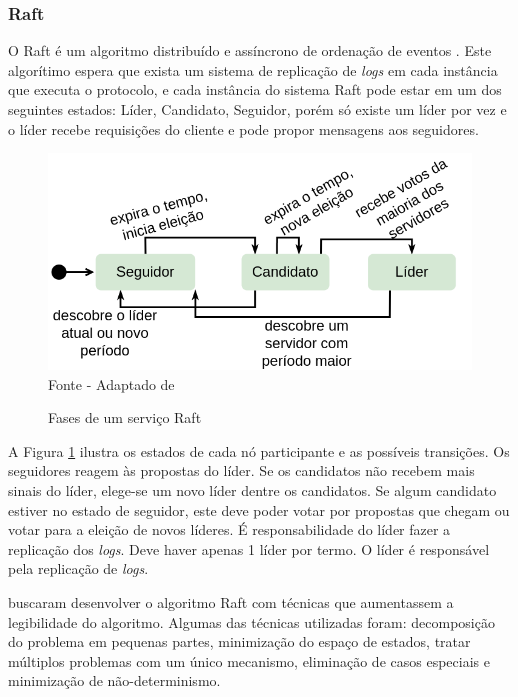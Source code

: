 \pagebreak

\subsubsection{Raft}

O Raft é um algoritmo distribuído e assíncrono de ordenação de eventos \cite{raft}. Este algorítimo espera que exista um sistema de replicação de \textit{logs} em cada instância que executa o protocolo, e cada instância do sistema Raft pode estar em um dos seguintes estados: Líder, Candidato, Seguidor, porém só existe um líder por vez e o líder recebe requisições do cliente e pode propor mensagens aos seguidores.

\begin{figure}[htb!]
\centering
\caption{Fases de um serviço Raft}
\includegraphics[width=0.75\linewidth]{figures/raft-states.drawio.png}
\label{fig:raft}
{\flushleft Fonte - Adaptado de \cite{raft}}
\end{figure}

A Figura \ref{fig:raft} ilustra os estados de cada nó participante e as possíveis transições. Os seguidores reagem às propostas do líder. Se os candidatos não recebem mais sinais do líder, elege-se um novo líder dentre os candidatos. Se algum candidato estiver no estado de seguidor, este deve poder votar por propostas que chegam ou votar para a eleição de novos líderes. É responsabilidade do líder fazer a replicação dos \textit{logs}. Deve haver apenas 1 líder por termo. O líder é responsável pela replicação de \textit{logs}.

\textcite{raft} buscaram desenvolver o algoritmo Raft com técnicas que aumentassem a legibilidade do algoritmo. Algumas das técnicas utilizadas foram: decomposição do problema em pequenas partes, minimização do espaço de estados, tratar múltiplos problemas com um único mecanismo, eliminação de casos especiais e minimização de não-determinismo.


